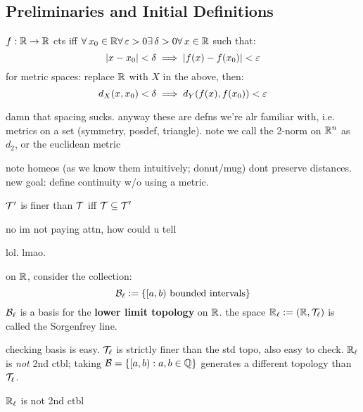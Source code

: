 \subsection{Preliminaries and Initial Definitions}

\begin{defn}
    $f:\mathbb{R}\rightarrow\mathbb{R}$ cts iff $\forall \, x_{0}\in\mathbb{R}\forall \, \varepsilon>0
    \exists \, \delta>0 \forall \, x\in\mathbb{R}$ such that:
    \begin{equation*}
        \abs{x-x_{0}}<\delta\implies\abs{f(x)-f(x_{0})}<\varepsilon
    \end{equation*}
    for metric spaces: replace $\mathbb{R}$ with $X$ in the above, then:
    \begin{equation*}
        d_{X}(x,x_{0})<\delta\implies d_{Y}(f(x),f(x_{0}))<\varepsilon
    \end{equation*}
\end{defn}
damn that spacing sucks. anyway these are defns we're alr familiar with, i.e.
metrics on a set (symmetry, posdef, triangle).
note we call the 2-norm on $\mathbb{R}^{n}$ as $d_{2}$, or the euclidean metric

note homeos (as we know them intuitively; donut/mug) dont preserve distances.
new goal: define continuity w/o using a metric.

\begin{defn}
    $\mathcal{T}'$ is finer than $\mathcal{T}$ iff $\mathcal{T}\subseteq\mathcal{T}'$
\end{defn}
no im not paying attn, how could u tell

\newpage
{}
lol. lmao.

\begin{xmp}[source=Primary Source Material,title=Sorgenfrey Line]
    on $\mathbb{R}$, consider the collection:
    \begin{equation*}
        \mathcal{B}_{\ell} := \left\{{[a,b) \textrm{ bounded intervals}}\right\}
    \end{equation*}
    $\mathcal{B}_{\ell}$ is a basis for the \textbf{lower limit topology} on $\mathbb{R}$.
    the space $\mathbb{R}_{\ell}:=(\mathbb{R},\mathcal{T}_{\ell})$ is called the Sorgenfrey line.
\end{xmp}

checking basis is easy. $\mathcal{T}_{\ell}$ is strictly finer than the std topo,
also easy to check.
$\mathbb{R}_{\ell}$ is \textit{not} 2nd ctbl; taking $\mathcal{B}=\left\{{[a,b):a,b\in\mathbb{Q}}\right\}$
generates a different topology than $\mathcal{T}_{\ell}$.

\begin{prop}
    $\mathbb{R}_{\ell}$ is not 2nd ctbl
\end{prop}

